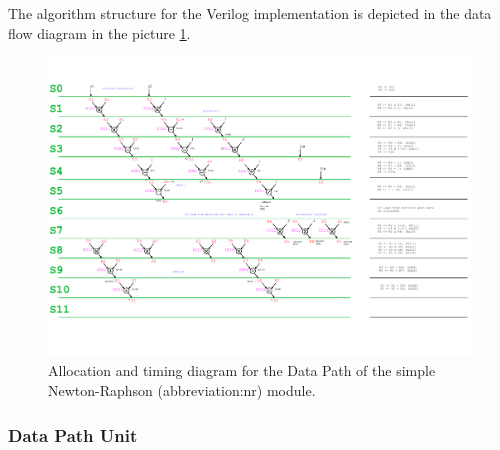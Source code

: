\documentclass[a4paper, twoside, 11pt]{article}
\newcommand{\fbar}{\FloatBarrier}
\begin{document}
            The algorithm structure for the Verilog implementation is depicted in the data flow diagram in the picture \ref{fig:simple-nr-allocation-timing}.
            \begin{figure}[htbp!]
                \centering
                \includegraphics[width=1\textwidth]{src/pdf/simple-nr-allocation-timing.pdf}
                \caption{Allocation and timing diagram for the Data Path of the simple Newton-Raphson (\gls{abbreviation:nr}) module.}
                \label{fig:simple-nr-allocation-timing}
            \end{figure}

        \fbar
        \subsubsection{Data Path Unit}
\end{document}
